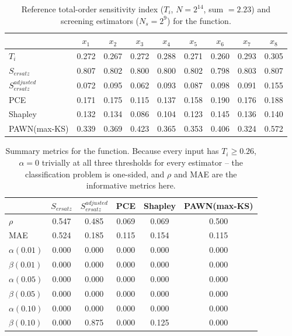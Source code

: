 \documentclass[12pt]{article}
\begin{document}
\begin{table}[H]
\centering
\begin{tabular}{@{}lcccccccc@{}} \toprule
 & $x_1$ & $x_2$ & $x_3$ & $x_4$ & $x_5$ & $x_6$ & $x_7$ & $x_8$ \\ \midrule
$T_i$                   & 0.272 & 0.267 & 0.272 & 0.288 & 0.271 & 0.260 & 0.293 & 0.305 \\
$S_{ersatz}$            & 0.807 & 0.802 & 0.800 & 0.800 & 0.802 & 0.798 & 0.803 & 0.807 \\
$S^{adjusted}_{ersatz}$ & 0.072 & 0.095 & 0.062 & 0.093 & 0.087 & 0.098 & 0.091 & 0.155 \\
PCE                     & 0.171 & 0.175 & 0.115 & 0.137 & 0.158 & 0.190 & 0.176 & 0.188 \\
Shapley                 & 0.132 & 0.134 & 0.086 & 0.104 & 0.123 & 0.145 & 0.136 & 0.140 \\
PAWN(max-KS)            & 0.339 & 0.369 & 0.423 & 0.365 & 0.353 & 0.406 & 0.324 & 0.572 \\ \bottomrule
\end{tabular}
\caption{Reference total-order sensitivity index ($T_i$, $N=2^{14}$, sum $=2.23$) and screening estimators ($N_s=2^9$) for the \cite{bratley1992implementation} function.}
\label{tab:bratley92_function}
\end{table}

\begin{table}[H]
\centering
\begin{tabular}{@{}l|ccccc@{}} \toprule
 & $S_{ersatz}$ & $S^{adjusted}_{ersatz}$ & PCE & Shapley & PAWN(max-KS) \\ \midrule
$\rho$           & 0.547 & 0.485 & 0.069 & 0.069 & 0.500 \\
MAE              & 0.524 & 0.185 & 0.115 & 0.154 & 0.115 \\
$\alpha(0.01)$   & 0.000 & 0.000 & 0.000 & 0.000 & 0.000 \\
$\beta(0.01)$    & 0.000 & 0.000 & 0.000 & 0.000 & 0.000 \\
$\alpha(0.05)$   & 0.000 & 0.000 & 0.000 & 0.000 & 0.000 \\
$\beta(0.05)$    & 0.000 & 0.000 & 0.000 & 0.000 & 0.000 \\
$\alpha(0.10)$   & 0.000 & 0.000 & 0.000 & 0.000 & 0.000 \\
$\beta(0.10)$    & 0.000 & 0.875 & 0.000 & 0.125 & 0.000 \\ \bottomrule
\end{tabular}
\caption{Summary metrics for the \cite{bratley1992implementation} function. Because every input has $T_i \ge 0.26$, $\alpha=0$ trivially at all three thresholds for every estimator -- the classification problem is one-sided, and $\rho$ and MAE are the informative metrics here.}
\label{tab:bratley92_summary}
\end{table}
\end{document}
